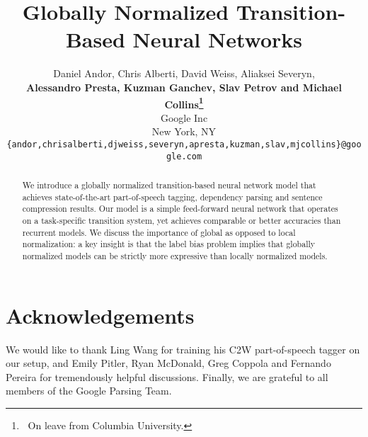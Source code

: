 \documentclass[11pt]{article}
\title{Globally Normalized Transition-Based Neural Networks}
\author{
  Daniel Andor, Chris Alberti, David Weiss, Aliaksei Severyn, \\
    {\bf Alessandro Presta, Kuzman Ganchev, Slav Petrov and Michael Collins\thanks{$\;\;$On leave from Columbia University.}}\\
  Google Inc\\
  New York, NY\\
  {\footnotesize \tt \{andor,chrisalberti,djweiss,severyn,apresta,kuzman,slav,mjcollins\}@google.com}
}
\date{}
\begin{document}
\maketitle

\begin{abstract}
We introduce a globally normalized transition-based neural network
model that achieves state-of-the-art part-of-speech tagging,
dependency parsing and sentence compression results.  Our model is a
simple feed-forward neural network that operates on a task-specific
transition system, yet achieves comparable or better accuracies than
recurrent models.
We discuss the importance of global as opposed to local normalization:
a key insight is that the label bias problem implies that
globally
normalized models can be strictly more expressive 
than locally normalized models.
\end{abstract}

\graphicspath{{./figs/}}
\newcommand{\bX}{\mathbf{X}}
\newcommand{\bE}{\mathbf{E}}
\newcommand{\bb}{\mathbf{b}}
\newcommand{\bH}{\mathbf{H}}
\newcommand{\bW}{\mathbf{W}}
\newcommand{\bh}{\mathbf{h}}
\newcommand{\mwords}{\mathrm{word}}
\newcommand{\mtags}{\mathrm{tag}}
\newcommand{\mlabels}{\mathrm{label}}
\newcommand{\todo}[1]{{\bf \color{red}{TODO: #1}}}
\newcommand{\eat}[1]{\ignorespaces}
\newcommand{\commentout}[1]{}
\newcommand\T{\rule{0pt}{4ex}}  %








\ifaclfinal
\section*{Acknowledgements}

We would like to thank Ling Wang for training his C2W part-of-speech tagger on our setup,
and Emily Pitler, Ryan McDonald, Greg Coppola and
Fernando Pereira for tremendously helpful discussions.
Finally, we are grateful to all members of the Google Parsing Team.
\else\fi

\balance


\end{document}
